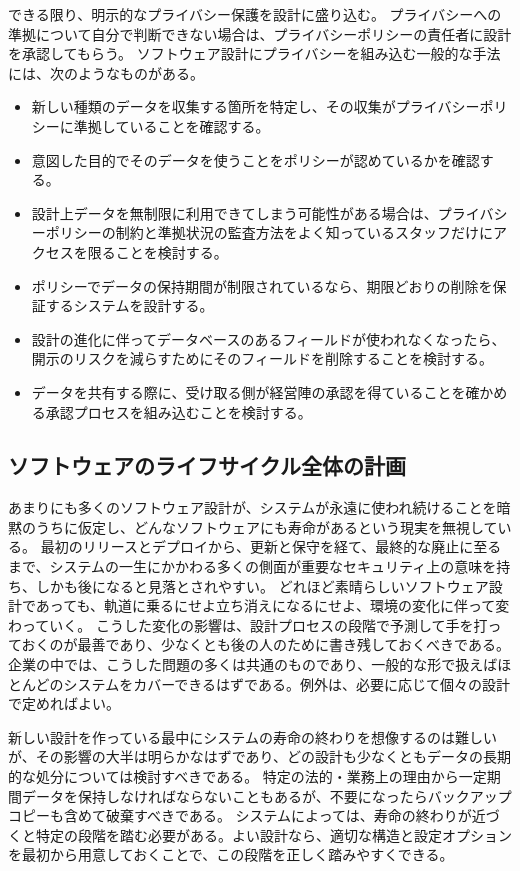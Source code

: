 \documentclass[uplatex]{jsarticle}
\def\label#1{}%
\begin{document}
できる限り、明示的なプライバシー保護を設計に盛り込む。
プライバシーへの準拠について自分で判断できない場合は、プライバシーポリシーの責任者に設計を承認してもらう。
ソフトウェア設計にプライバシーを組み込む一般的な手法には、次のようなものがある。
\begin{itemize}
\item 新しい種類のデータを収集する箇所を特定し、その収集がプライバシーポリシーに準拠していることを確認する。
\item 意図した目的でそのデータを使うことをポリシーが認めているかを確認する。
\item 設計上データを無制限に利用できてしまう可能性がある場合は、プライバシーポリシーの制約と準拠状況の監査方法をよく知っているスタッフだけにアクセスを限ることを検討する。
\item ポリシーでデータの保持期間が制限されているなら、期限どおりの削除を保証するシステムを設計する。
\item 設計の進化に伴ってデータベースのあるフィールドが使われなくなったら、開示のリスクを減らすためにそのフィールドを削除することを検討する。
\item データを共有する際に、受け取る側が経営陣の承認を得ていることを確かめる承認プロセスを組み込むことを検討する。
\end{itemize}

\subsection{ソフトウェアのライフサイクル全体の計画}\label{subsec:ch6-full-lifecycle}

あまりにも多くのソフトウェア設計が、システムが永遠に使われ続けることを暗黙のうちに仮定し、どんなソフトウェアにも寿命があるという現実を無視している。
最初のリリースとデプロイから、更新と保守を経て、最終的な廃止に至るまで、システムの一生にかかわる多くの側面が重要なセキュリティ上の意味を持ち、しかも後になると見落とされやすい。
どれほど素晴らしいソフトウェア設計であっても、軌道に乗るにせよ立ち消えになるにせよ、環境の変化に伴って変わっていく。
こうした変化の影響は、設計プロセスの段階で予測して手を打っておくのが最善であり、少なくとも後の人のために書き残しておくべきである。
企業の中では、こうした問題の多くは共通のものであり、一般的な形で扱えばほとんどのシステムをカバーできるはずである。例外は、必要に応じて個々の設計で定めればよい。

新しい設計を作っている最中にシステムの寿命の終わりを想像するのは難しいが、その影響の大半は明らかなはずであり、どの設計も少なくともデータの長期的な処分については検討すべきである。
特定の法的・業務上の理由から一定期間データを保持しなければならないこともあるが、不要になったらバックアップコピーも含めて破棄すべきである。
システムによっては、寿命の終わりが近づくと特定の段階を踏む必要がある。よい設計なら、適切な構造と設定オプションを最初から用意しておくことで、この段階を正しく踏みやすくできる。
\end{document}
